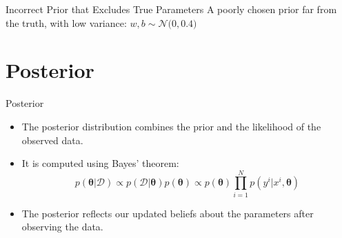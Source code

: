 \documentclass{beamer}
\begin{document}
\begin{frame}{Incorrect Prior that Excludes True Parameters}
  A poorly chosen prior far from the truth, with low variance:
  \(
    w, b \sim \mathcal{N}\big(0, 0.4\big)
  \)

  \begin{center}
  \end{center}
\end{frame}

\section{Posterior}

\begin{frame}{Posterior}
  \begin{itemize}
  \item The posterior distribution combines the prior and the likelihood of the observed data.
  \item It is computed using Bayes' theorem:
    \[
      p(\bm{\theta} | \mathcal{D}) \propto p(\mathcal{D} | \bm{\theta}) p(\bm{\theta})
                                   \propto p(\bm{\theta}) \prod_{i=1}^{N} p(y^i | x^i, \bm{\theta})
  \]

  \item The posterior reflects our updated beliefs about the parameters after observing the data.
  \end{itemize}
\end{frame}
\end{document}
